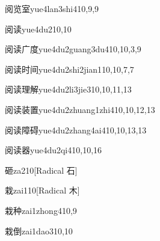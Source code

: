 \begin{verbete}{阅览室}{yue4lan3shi4}{10,9,9}
\end{verbete}

\begin{verbete}{阅读}{yue4du2}{10,10}
\end{verbete}

\begin{verbete}{阅读广度}{yue4du2guang3du4}{10,10,3,9}
\end{verbete}

\begin{verbete}{阅读时间}{yue4du2shi2jian1}{10,10,7,7}
\end{verbete}

\begin{verbete}{阅读理解}{yue4du2li3jie3}{10,10,11,13}
\end{verbete}

\begin{verbete}{阅读装置}{yue4du2zhuang1zhi4}{10,10,12,13}
\end{verbete}

\begin{verbete}{阅读障碍}{yue4du2zhang4ai4}{10,10,13,13}
\end{verbete}

\begin{verbete}{阅读器}{yue4du2qi4}{10,10,16}
\end{verbete}

\begin{verbete}{砸}{za2}{10}[Radical 石]
\end{verbete}

\begin{verbete}{栽}{zai1}{10}[Radical 木]
\end{verbete}

\begin{verbete}{栽种}{zai1zhong4}{10,9}
\end{verbete}

\begin{verbete}{栽倒}{zai1dao3}{10,10}
\end{verbete}

